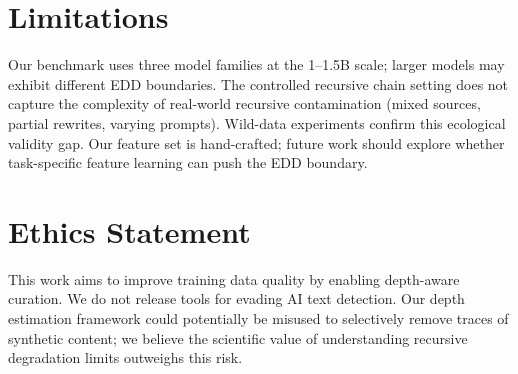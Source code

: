 \documentclass[11pt,a4paper]{article}
\begin{document}
\section*{Limitations}

Our benchmark uses three model families at the 1--1.5B scale; larger models may exhibit different EDD boundaries.
The controlled recursive chain setting does not capture the complexity of real-world recursive contamination (mixed sources, partial rewrites, varying prompts).
Wild-data experiments confirm this ecological validity gap.
Our feature set is hand-crafted; future work should explore whether task-specific feature learning can push the EDD boundary.

\section*{Ethics Statement}

This work aims to improve training data quality by enabling depth-aware curation.
We do not release tools for evading AI text detection.
Our depth estimation framework could potentially be misused to selectively remove traces of synthetic content; we believe the scientific value of understanding recursive degradation limits outweighs this risk.
\end{document}
